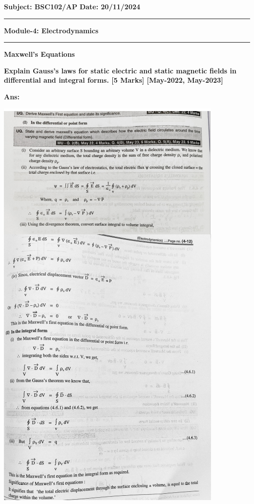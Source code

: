 \documentclass{exam}
\begin{document}
\noindent
\textbf{Subject: BSC102/AP} \hfill { \textbf{Date: 20/11/2024} }\\ 
\hrule
\begin{center}
\textbf{\large Module-4: Electrodynamics } 
\end{center}
\hrule
\vspace{0.3cm}

\begin{center} \textbf{ \Large Maxwell's Equations} \end{center}

\begin{questions}
\question \textbf{ Explain Gauss’s laws for static electric and static magnetic fields in differential and integral forms. \hfil [5 Marks] [May-2022, May-2023] }
	
\textbf{Ans:}
\begin{center}
\includegraphics[scale=0.45]{Q1.png} 
\end{center}


\end{questions}
\end{document}
